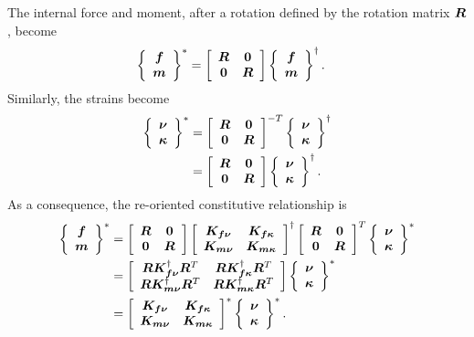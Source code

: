 The internal force and moment, after a rotation defined by the rotation
matrix $\TT{R}$, become
\begin{align}
	\cubr{\cvvect{
		\T{f} \\
		\T{m}
	}}^*
	&= \sqbr{\matr{cc}{
		\TT{R} & \TT{0} \\
		\TT{0} & \TT{R}
	}}
	\cubr{\cvvect{
		\T{f} \\
		\T{m}
	}}^\dagger
	.
\end{align}
Similarly, the strains become
\begin{align}
	\cubr{\cvvect{
		\T{\nu} \\
		\T{\kappa}
	}}^*
	&= \sqbr{\matr{cc}{
		\TT{R} & \TT{0} \\
		\TT{0} & \TT{R}
	}}^{-T}
	\cubr{\cvvect{
		\T{\nu} \\
		\T{\kappa}
	}}^\dagger
	\nonumber \\
	&= \sqbr{\matr{cc}{
		\TT{R} & \TT{0} \\
		\TT{0} & \TT{R}
	}}
	\cubr{\cvvect{
		\T{\nu} \\
		\T{\kappa}
	}}^\dagger
	.
\end{align}
As a consequence, the re-oriented constitutive relationship is
\begin{align}
	\cubr{\cvvect{
		\T{f} \\
		\T{m}
	}}^*
	&=
	\sqbr{\matr{cc}{
		\TT{R} & \TT{0} \\
		\TT{0} & \TT{R}
	}}
	\sqbr{\matr{cc}{
		\TT{K}_{\T{f}\T{\nu}} & \TT{K}_{\T{f}\T{\kappa}} \\
		\TT{K}_{\T{m}\T{\nu}} & \TT{K}_{\T{m}\T{\kappa}}
	}}^\dagger
	\sqbr{\matr{cc}{
		\TT{R} & \TT{0} \\
		\TT{0} & \TT{R}
	}}^T
	\cubr{\cvvect{
		\T{\nu} \\
		\T{\kappa}
	}}^*
	\nonumber \\
	&=
	\sqbr{\matr{cc}{
		\TT{R} \TT{K}_{\T{f}\T{\nu}}^\dagger \TT{R}^T
			& \TT{R} \TT{K}_{\T{f}\T{\kappa}}^\dagger \TT{R}^T \\
		\TT{R} \TT{K}_{\T{m}\T{\nu}}^\dagger \TT{R}^T
			& \TT{R} \TT{K}_{\T{m}\T{\kappa}}^\dagger \TT{R}^T
	}}
	\cubr{\cvvect{
		\T{\nu} \\
		\T{\kappa}
	}}^*
	\nonumber \\
	&=
	\sqbr{\matr{cc}{
		\TT{K}_{\T{f}\T{\nu}} & \TT{K}_{\T{f}\T{\kappa}} \\
		\TT{K}_{\T{m}\T{\nu}} & \TT{K}_{\T{m}\T{\kappa}}
	}}^*
	\cubr{\cvvect{
		\T{\nu} \\
		\T{\kappa}
	}}^*
	.
\end{align}

